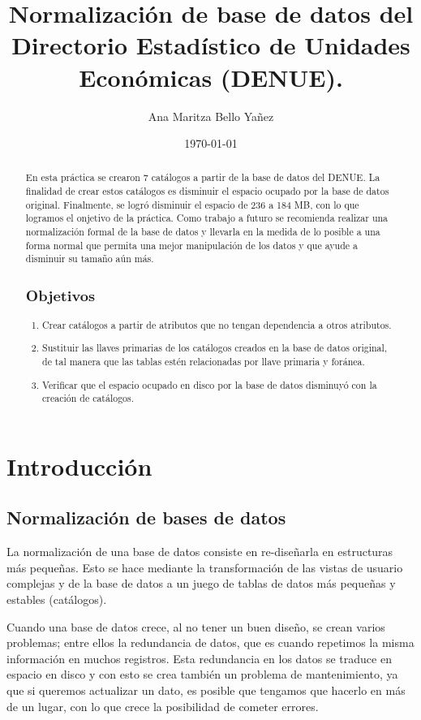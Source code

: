 \documentclass{article}
\title{Normalización de base de datos del Directorio Estadístico de Unidades Económicas (DENUE).}
\author{
    Ana Maritza Bello Yañez
}
\date{\today}
\begin{document}
\maketitle


\begin{abstract}
    En esta práctica se crearon 7 catálogos a partir de la base de datos del
    DENUE. La finalidad de crear estos catálogos es disminuir el espacio ocupado
    por la base de datos original. Finalmente, se logró disminuir el espacio de
    236 a 184 MB, con lo que logramos el onjetivo de la práctica.
    Como trabajo a futuro se recomienda realizar una normalización formal de la
    base de datos y llevarla en la medida de lo posible a una forma normal que
    permita una mejor manipulación de los datos y que ayude a disminuir su
    tamaño aún más.

    \subsection*{Objetivos}
    \begin{enumerate}
        \item Crear catálogos a partir de atributos que no tengan dependencia a
        otros atributos.
        \item Sustituir las llaves primarias de los catálogos creados en la base
        de datos original, de tal manera que las tablas estén relacionadas por
        llave primaria y foránea.
        \item Verificar que el espacio ocupado en disco por la base de datos
        disminuyó con la creación de catálogos.
    \end{enumerate}
\end{abstract}

\section{Introducción}

\subsection*{Normalización de bases de datos}

La normalización de una base de datos consiste en re-diseñarla en estructuras
más pequeñas. Esto se hace mediante la transformación de las vistas de usuario
complejas y de la base de datos a un juego de tablas de datos más pequeñas y
estables (catálogos).

Cuando una base de datos crece, al no tener un buen diseño, se crean varios
problemas; entre ellos la redundancia de datos, que es cuando repetimos la misma
información en muchos registros. Esta redundancia en los datos se traduce en
espacio en disco y con esto se crea también un problema de mantenimiento, ya que
si queremos actualizar un dato, es posible que tengamos que hacerlo en más de un
lugar, con lo que crece la posibilidad de cometer errores.
\end{document}
